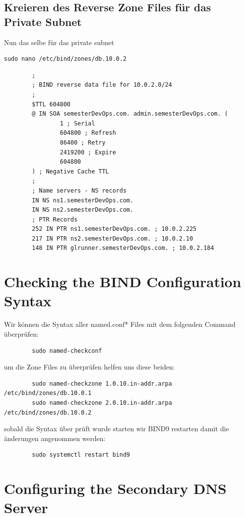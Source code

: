 \documentclass[a4paper,12pt]{article}
\begin{document}
\newpage

\subsection{Kreieren des Reverse Zone Files für das Private Subnet}
Nun das selbe für das private subnet

\begin{verbatim}
sudo nano /etc/bind/zones/db.10.0.2
\end{verbatim}

\begin{verbatim}
		;
		; BIND reverse data file for 10.0.2.0/24
		;
		$TTL 604800
		@ IN SOA semesterDevOps.com. admin.semesterDevOps.com. (
				1 ; Serial 
				604800 ; Refresh
				86400 ; Retry
				2419200 ; Expire
				604800 
		) ; Negative Cache TTL
		;
		; Name servers - NS records
		IN NS ns1.semesterDevOps.com.
		IN NS ns2.semesterDevOps.com.
		; PTR Records
		252 IN PTR ns1.semesterDevOps.com. ; 10.0.2.225
		217 IN PTR ns2.semesterDevOps.com. ; 10.0.2.10
		148 IN PTR glrunner.semesterDevOps.com. ; 10.0.2.184
\end{verbatim}

\section{Checking the BIND Configuration Syntax}
Wir können die Syntax aller named.conf* Files mit dem folgenden Command überprüfen:

\begin{verbatim}
		sudo named-checkconf
\end{verbatim}
um die Zone Files zu überprüfen helfen uns diese beiden:
\begin{verbatim}
		sudo named-checkzone 1.0.10.in-addr.arpa /etc/bind/zones/db.10.0.1
		sudo named-checkzone 2.0.10.in-addr.arpa /etc/bind/zones/db.10.0.2
\end{verbatim}
sobald die Syntax über prüft wurde starten wir BIND9 restarten damit die änderungen angenommen werden:
\begin{verbatim}
		sudo systemctl restart bind9
\end{verbatim}

\section{Configuring the Secondary DNS Server}
\end{document}
